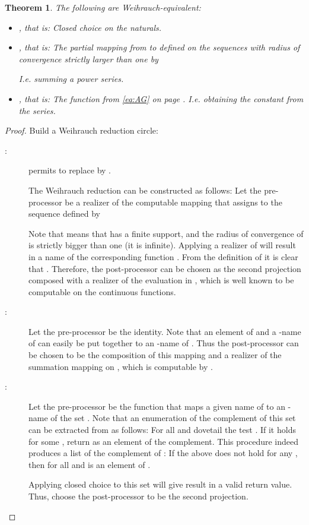 \documentclass{eptcs-modified}
\newtheorem{theorem}{Theorem}
\begin{document}
			\begin{theorem}\label{thm:main germs}
				The following are Weihrauch-equivalent:
				\begin{itemize}
					\item \textbf{}, that is: Closed choice on the naturals.
					\item \textbf{}, that is: The partial mapping from  to  defined on the sequences with radius of convergence strictly larger than one by
					
					I.e. summing a power series.
					\item \textbf{}, that is: The function from \cref{eq:AG} on page \pageref{eq:AG}. I.e. obtaining the constant from the series.
				\end{itemize}
			\end{theorem}

			\begin{proof}
			Build a Weihrauch reduction circle:
				\begin{description}
					\item[:]
					 permits to replace  by .

					The Weihrauch reduction  can be constructed as follows:
					Let the pre-processor be a realizer of the computable mapping that assigns to  the sequence  defined by
					
					Note that  means that  has a finite support, and the radius of convergence of  is strictly bigger than one (it is infinite).
					Applying a realizer of  will result in a name of the corresponding function .
					From the definition of  it is clear that .
					Therefore, the post-processor can be chosen as the second projection composed with a realizer of the evaluation in , which is well known to be computable on the continuous functions.
				\item[:]
					Let the pre-processor be the identity.
					Note that an element of  and a -name of  can easily be put together to an -name of .
					Thus the post-processor can be chosen to be the composition of this mapping and a realizer of the summation mapping on , which is computable by .
				\item[:]
					Let the pre-processor be the function that maps a given name  of  to an -name of the set .
					Note that an enumeration of the complement of this set can be extracted from  as follows:
					For all  and  dovetail the test .
					If it holds for some , return  as an element of the complement.
					This procedure indeed produces a list of the complement of :
					If the above does not hold for any , then  for all  and  is an element of .

					Applying closed choice to this set will give result in a valid return value.
					Thus, choose the post-processor to be the second projection.
				\end{description}
			\end{proof}
\end{document}
